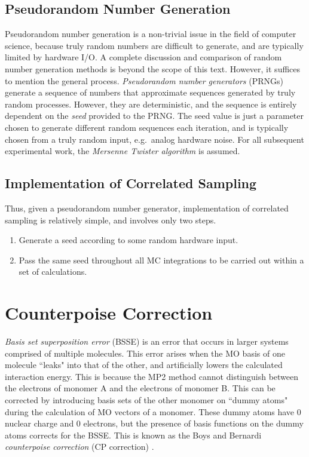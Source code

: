 \subsection{Pseudorandom Number Generation}
\label{s:prng}

Pseudorandom number generation is a non-trivial issue in the field of computer
science, because truly random numbers are difficult to generate, and are
typically limited by hardware I/O. A complete discussion and comparison of
random number generation methods is beyond the scope of this text. However, it
suffices to mention the general process. \emph{Pseudorandom number generators}
(PRNGs) generate a sequence of numbers that approximate sequences generated by
truly random processes. However, they are deterministic, and the sequence is
entirely dependent on the \emph{seed} provided to the PRNG. The seed value is
just a parameter chosen to generate different random sequences each iteration,
and is typically chosen from a truly random input, e.g.\ analog hardware noise.
For all subsequent experimental work, the \emph{Mersenne Twister algorithm}
\cite{mersenne} is assumed.

\subsection{Implementation of Correlated Sampling}

Thus, given a pseudorandom number generator, implementation of correlated
sampling is relatively simple, and involves only two steps.

\begin{enumerate}

\item Generate a seed according to some random hardware input.

\item Pass the same seed throughout all MC integrations to be carried out within
a set of calculations.

\end{enumerate}

\section{Counterpoise Correction}
\label{s:CP}

\emph{Basis set superposition error} (BSSE) is an error that occurs in larger
systems comprised of multiple molecules. This error arises when the MO basis of
one molecule ``leaks" into that of the other, and artificially lowers the
calculated interaction energy. This is because the MP2 method cannot distinguish
between the electrons of monomer A and the electrons of monomer B. This can be
corrected by introducing basis sets of the other monomer on ``dummy atoms"
during the calculation of MO vectors of a monomer. These dummy atoms have 0
nuclear charge and 0 electrons, but the presence of basis functions on the dummy
atoms corrects for the BSSE. This is known as the Boys and Bernardi
\emph{counterpoise correction} (CP correction) \cite{cp}.

